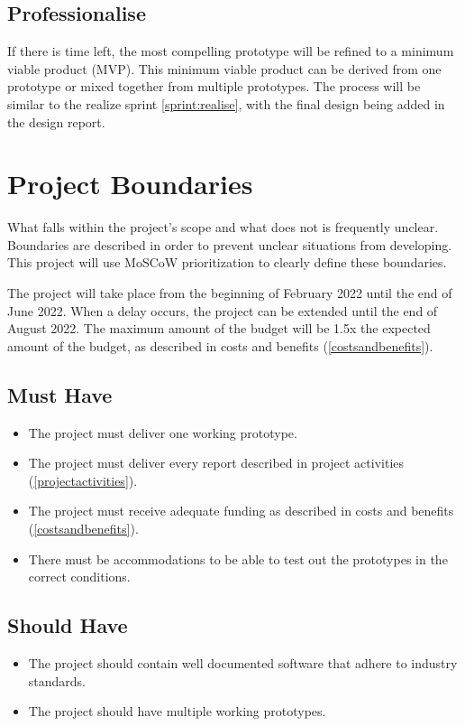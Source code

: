 \documentclass[11pt, a4paper]{article}
\begin{document}
\subsection{Professionalise}
If there is time left, the most compelling prototype will be refined to a minimum viable product (MVP). \cite{mvp} This minimum viable product can be derived from one prototype or mixed together from multiple prototypes. The process will be similar to the realize sprint \ref{sprint:realise}, with the final design being added in the design report.

\section{Project Boundaries} \label{projectboundaries}
What falls within the project’s scope and what does not is frequently  unclear. Boundaries are described in order to prevent unclear situations from developing. This project will use MoSCoW prioritization to clearly define these boundaries. \cite{moscow}

The project will take place from the beginning of February 2022 until the end of June 2022. When a delay occurs, the project can be extended until the end of August 2022. The maximum amount of the budget will be 1.5x the expected amount of the budget, as described in costs and benefits (\ref{costsandbenefits}).

\subsection{Must Have}
\begin{itemize}
  \item The project must deliver one working prototype.
  \item The project must deliver every report described in project activities (\ref{projectactivities}).
  \item The project must receive adequate funding as described in costs and benefits (\ref{costsandbenefits}).
  \item There must be accommodations to be able to test out the prototypes in the correct conditions.
\end{itemize}
\subsection{Should Have}
\begin{itemize}
  \item The project should contain well documented software that adhere to industry standards.
  \item The project should have multiple working prototypes.
\end{itemize}
\end{document}
